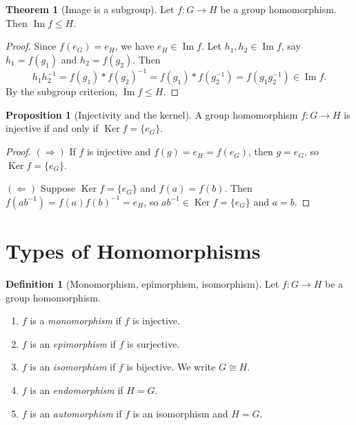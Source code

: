 \documentclass[12pt,a4paper,openany]{book}
\theoremstyle{definition}
\newtheorem{definition}{Definition}[chapter]
\newtheorem{theorem}{Theorem}[chapter]
\newtheorem{proposition}{Proposition}[chapter]
\theoremstyle{remark}
\DeclareMathOperator{\Ker}{Ker}
\DeclareMathOperator{\im}{Im}
\begin{document}
\begin{theorem}[Image is a subgroup]\label{thm:im-subgroup}
Let $f\colon G\to H$ be a group homomorphism.
Then $\im f \le H$.
\end{theorem}

\begin{proof}
Since $f(e_G)=e_H$, we have $e_H\in\im f$.
Let $h_1,h_2\in\im f$, say $h_1=f(g_1)$ and $h_2=f(g_2)$.  Then
\[
   h_1 h_2^{-1} = f(g_1)\ast f(g_2)^{-1}
                 = f(g_1)\ast f(g_2^{-1})
                 = f(g_1 g_2^{-1}) \in \im f.
\]
By the subgroup criterion, $\im f\le H$.
\end{proof}

\begin{proposition}[Injectivity and the kernel]\label{prop:hom-injective-ker}
A group homomorphism $f\colon G\to H$ is injective if and only if
$\Ker f = \{e_G\}$.
\end{proposition}

\begin{proof}
$(\Rightarrow)$  If $f$ is injective and $f(g)=e_H=f(e_G)$, then
$g=e_G$, so $\Ker f=\{e_G\}$.

$(\Leftarrow)$  Suppose $\Ker f=\{e_G\}$ and $f(a)=f(b)$.  Then
$f(ab^{-1})=f(a)f(b)^{-1}=e_H$, so $ab^{-1}\in\Ker f=\{e_G\}$
and $a=b$.
\end{proof}

\section{Types of Homomorphisms}\label{sec:hom-types}

\begin{definition}[Monomorphism, epimorphism, isomorphism]\label{def:hom-types}
Let $f\colon G\to H$ be a group homomorphism.
\begin{enumerate}
\item $f$ is a \emph{monomorphism} if $f$ is injective.
\item $f$ is an \emph{epimorphism} if $f$ is surjective.
\item $f$ is an \emph{isomorphism} if $f$ is bijective.
      We write $G\cong H$.
\item $f$ is an \emph{endomorphism} if $H=G$.
\item $f$ is an \emph{automorphism} if $f$ is an isomorphism and $H=G$.
\end{enumerate}
\end{definition}
\end{document}
